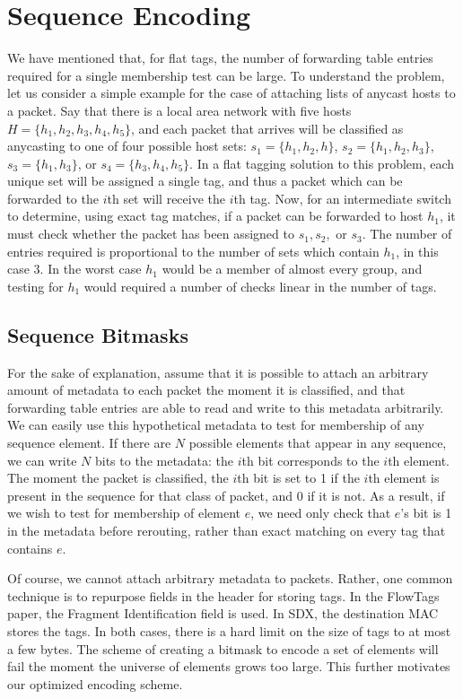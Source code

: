 

\section{Sequence Encoding}
We have mentioned that, for flat tags, the number of forwarding table entries required for a single membership test can be large. 
To understand the problem, let us consider a simple example for the case of attaching lists of anycast hosts to a packet. Say that there is a local area network with five hosts $H = \{h_1, h_2, h_3, h_4, h_5\}$, and each packet that arrives will be classified as anycasting to one of four possible host sets: $s_1 = \{h_1, h_2, h\}$, $s_2 = \{h_1, h_2, h_3\}$, $s_3 = \{h_1, h_3\}$, or $s_4 = \{h_3, h_4, h_5\}$. In a flat tagging solution to this problem, each unique set will be assigned a single tag, and thus a packet which can be forwarded to the $i$th set will receive the $i$th tag. Now, for an intermediate switch to determine, using exact tag matches, if a packet can be forwarded to host $h_1$, it must check whether the packet has been assigned to $s_1, s_2,$ or $s_3$. The number of entries required is proportional to the number of sets which contain $h_1$, in this case 3. In the worst case $h_1$ would be a member of almost every group, and testing for $h_1$ would required a number of checks linear in the number of tags. 


\subsection{Sequence Bitmasks}

For the sake of explanation, assume that it is possible to attach an arbitrary
amount of metadata to each packet the moment it is classified,
and that forwarding table entries are
able to read and write to this metadata arbitrarily. We can easily use this hypothetical
metadata to test for membership of any sequence element. If there are $N$ possible elements that appear in any sequence, we can write $N$ bits to the
metadata: the $i$th bit corresponds to the $i$th element. The moment the packet is classified, the $i$th bit is set to 1 if the $i$th element is present in the sequence for that class of packet, and 0 if it is not. As a result, if we wish to test for membership of element $e$, we need only check that $e$'s bit is 1 in the metadata before rerouting, rather
than exact matching on every tag that contains $e$.

Of course, we cannot attach arbitrary metadata to packets. Rather, one common technique is to repurpose fields in the header for storing tags. In the FlowTags paper, the Fragment Identification field is used. In SDX, the destination MAC stores the tags. In both cases, there is a hard limit on the size of tags to at most a few bytes. The scheme of creating a bitmask to encode a set of elements will fail the moment the universe of elements grows too large. This further motivates our optimized encoding scheme.


